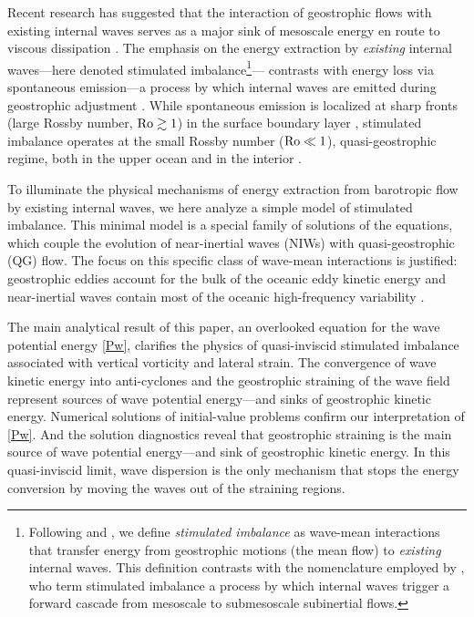 \documentclass{jfm}
\begin{document}
Recent research has suggested that the interaction
of geostrophic flows with existing internal waves serves
as a major sink of mesoscale energy en route to viscous dissipation
\citep{xie_vanneste2015,taylor_straub2016,wagner_young2016,barkan_etal2016}.
The emphasis on the energy extraction by \textit{existing} internal waves---here
denoted stimulated imbalance\footnote{Following \cite{xie_vanneste2015} and
\cite{wagner_young2016}, we define
\textit{stimulated imbalance} as wave-mean interactions that transfer energy from
geostrophic motions (the mean flow) to \textit{existing} internal
waves. This definition contrasts with the nomenclature employed by
\cite{barkan_etal2016}, who term stimulated imbalance a process by which
internal waves trigger a forward cascade from mesoscale to submesoscale subinertial flows.}---
contrasts with energy loss via spontaneous emission---a process
by which internal waves are emitted during geostrophic adjustment
\citep[e.g., ][]{shakespeare_hogg2017}. While spontaneous emission is localized
at sharp fronts (large Rossby number, $\mathrm{Ro}\gtrsim 1$) in the surface boundary
layer \citep[e.g., ][]{shakespeare_hogg2017}, stimulated imbalance operates at
the small Rossby number ($\mathrm{Ro}\ll 1$), quasi-geostrophic regime, both in the upper
ocean and in the interior \citep[e.g., ][]{xie_vanneste2015}.

To illuminate the physical mechanisms of energy extraction from
barotropic flow by existing internal waves, we here analyze a
simple model of stimulated imbalance. This minimal model is a special
family of solutions of the \cite{xie_vanneste2015} equations, which couple the
evolution of near-inertial waves (NIWs) with quasi-geostrophic (QG) flow. The
focus on this specific class of wave-mean interactions is justified:  geostrophic
eddies account for the bulk of the oceanic eddy kinetic energy
\cite[$90\%$,][]{ferrari_wunsch2009} and near-inertial waves contain most of the
oceanic high-frequency variability \citep{alford_etal2016}.

The main analytical result of this paper, an overlooked equation for the wave potential
energy \eqref{Pw}, clarifies the physics of quasi-inviscid stimulated imbalance
associated with vertical vorticity and lateral strain. The convergence of wave
kinetic energy into anti-cyclones and the geostrophic straining of the wave field
represent sources of wave potential energy---and sinks of geostrophic kinetic energy.
Numerical solutions of
initial-value problems confirm our interpretation of \eqref{Pw}. And the solution
diagnostics reveal that geostrophic straining is the main source of wave potential
energy---and sink of geostrophic kinetic energy. In this quasi-inviscid limit,
wave dispersion is the only mechanism that stops the energy conversion by moving
the waves out of the straining regions.
\end{document}
